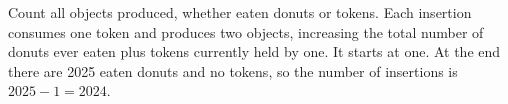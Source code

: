 Count all objects produced, whether eaten donuts or tokens. Each insertion consumes one token and produces two objects, increasing the total number of donuts ever eaten plus tokens currently held by one. It starts at one. At the end there are 2025 eaten donuts and no tokens, so the number of insertions is $2025-1=\boxed{2024}$.
